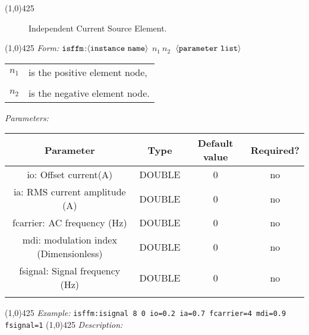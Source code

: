 \documentclass{article}
\begin{document}
\hrulefill\linethickness{0.5mm}\line(1,0){425}
\normalsize
\newline
\begin{figure}[h]
\centerline{\epsfxsize=0.5in}
\caption{Independent Current Source Element.}
\end{figure}
\newline
\linethickness{0.5mm} \line(1,0){425}
\newline
\textit{Form:}
$\tt isffm$:$\langle \tt{instance\ name}\rangle$
$n_1\ n_2\ $ $\langle \tt{parameter\ list}\rangle$
\newline
\begin{tabular}{r l}
$n_1$ & is the positive element node, \\
&  \\
$n_2$ & is the negative element node. \\
\end{tabular}
\newline
\textit{Parameters:}
\begin{table}[H]
\begin{tabular}{|c|c|c|c|}
\hline
Parameter&Type&Default value&Required?\\
\hline
io: Offset current(A) & DOUBLE & 0 & no\\
\hline
ia: RMS current amplitude (A) & DOUBLE & 0 & no\\
\hline
fcarrier: AC frequency (Hz) & DOUBLE & 0 & no\\
\hline
mdi: modulation index (Dimensionless) & DOUBLE & 0 & no\\
\hline
fsignal: Signal frequency (Hz) & DOUBLE & 0 & no\\
\par
\hline
\end{tabular}
\end{table}
\noindent\linethickness{0.5mm}\line(1,0){425}
\newline
\textit{Example:}
\newline
\texttt{isffm:isignal\ 8\ 0\ io=0.2 ia=0.7 fcarrier=4 mdi=0.9
fsignal=1}
\newline
\linethickness{0.5mm} \line(1,0){425}
\newline
\textit{Description:}\\
\end{document}
